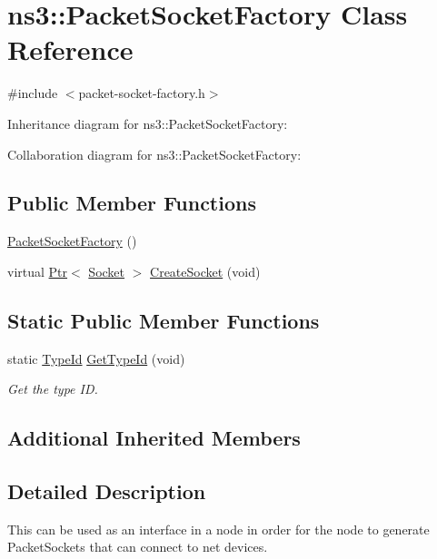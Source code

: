 \hypertarget{classns3_1_1PacketSocketFactory}{}\section{ns3\+:\+:Packet\+Socket\+Factory Class Reference}
\label{classns3_1_1PacketSocketFactory}


{\ttfamily \#include $<$packet-\/socket-\/factory.\+h$>$}



Inheritance diagram for ns3\+:\+:Packet\+Socket\+Factory\+:


Collaboration diagram for ns3\+:\+:Packet\+Socket\+Factory\+:
\subsection*{Public Member Functions}
\begin{DoxyCompactItemize}
\item 
\hyperlink{classns3_1_1PacketSocketFactory_a2daf4c27f997fe6a9909f3dcabb8a8eb}{Packet\+Socket\+Factory} ()
\item 
virtual \hyperlink{classns3_1_1Ptr}{Ptr}$<$ \hyperlink{classns3_1_1Socket}{Socket} $>$ \hyperlink{classns3_1_1PacketSocketFactory_a92096cbe185415788c366d36d2b84a65}{Create\+Socket} (void)
\end{DoxyCompactItemize}
\subsection*{Static Public Member Functions}
\begin{DoxyCompactItemize}
\item 
static \hyperlink{classns3_1_1TypeId}{Type\+Id} \hyperlink{classns3_1_1PacketSocketFactory_aac9d11f10d4b3f8516d5757fc9e2cb31}{Get\+Type\+Id} (void)
\begin{DoxyCompactList}\small\item\em Get the type ID. \end{DoxyCompactList}\end{DoxyCompactItemize}
\subsection*{Additional Inherited Members}


\subsection{Detailed Description}
This can be used as an interface in a node in order for the node to generate Packet\+Sockets that can connect to net devices. 

